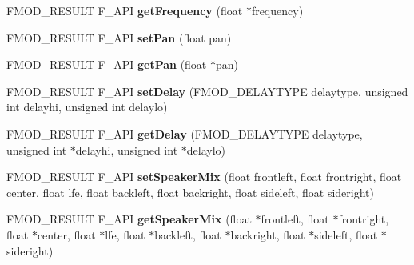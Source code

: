 \begin{DoxyCompactItemize}
\item 
F\+M\+O\+D\+\_\+\+R\+E\+S\+U\+LT F\+\_\+\+A\+PI {\bfseries get\+Frequency} (float $\ast$frequency)\hypertarget{class_f_m_o_d_1_1_channel_a99f1dcf4b2a67f509d08f138e9e3cbca}{}\label{class_f_m_o_d_1_1_channel_a99f1dcf4b2a67f509d08f138e9e3cbca}

\item 
F\+M\+O\+D\+\_\+\+R\+E\+S\+U\+LT F\+\_\+\+A\+PI {\bfseries set\+Pan} (float pan)\hypertarget{class_f_m_o_d_1_1_channel_a419235a572a267b0763287fe988435f7}{}\label{class_f_m_o_d_1_1_channel_a419235a572a267b0763287fe988435f7}

\item 
F\+M\+O\+D\+\_\+\+R\+E\+S\+U\+LT F\+\_\+\+A\+PI {\bfseries get\+Pan} (float $\ast$pan)\hypertarget{class_f_m_o_d_1_1_channel_a776a9e6fbca132087663e77de052806c}{}\label{class_f_m_o_d_1_1_channel_a776a9e6fbca132087663e77de052806c}

\item 
F\+M\+O\+D\+\_\+\+R\+E\+S\+U\+LT F\+\_\+\+A\+PI {\bfseries set\+Delay} (F\+M\+O\+D\+\_\+\+D\+E\+L\+A\+Y\+T\+Y\+PE delaytype, unsigned int delayhi, unsigned int delaylo)\hypertarget{class_f_m_o_d_1_1_channel_a21a2f9d9fdae503ce53a9ced9c4cb9a2}{}\label{class_f_m_o_d_1_1_channel_a21a2f9d9fdae503ce53a9ced9c4cb9a2}

\item 
F\+M\+O\+D\+\_\+\+R\+E\+S\+U\+LT F\+\_\+\+A\+PI {\bfseries get\+Delay} (F\+M\+O\+D\+\_\+\+D\+E\+L\+A\+Y\+T\+Y\+PE delaytype, unsigned int $\ast$delayhi, unsigned int $\ast$delaylo)\hypertarget{class_f_m_o_d_1_1_channel_a8cc8b51bc344dd7916628568764aa6cf}{}\label{class_f_m_o_d_1_1_channel_a8cc8b51bc344dd7916628568764aa6cf}

\item 
F\+M\+O\+D\+\_\+\+R\+E\+S\+U\+LT F\+\_\+\+A\+PI {\bfseries set\+Speaker\+Mix} (float frontleft, float frontright, float center, float lfe, float backleft, float backright, float sideleft, float sideright)\hypertarget{class_f_m_o_d_1_1_channel_ad6b62bf51be6c5c3006e23717e8ad4c7}{}\label{class_f_m_o_d_1_1_channel_ad6b62bf51be6c5c3006e23717e8ad4c7}

\item 
F\+M\+O\+D\+\_\+\+R\+E\+S\+U\+LT F\+\_\+\+A\+PI {\bfseries get\+Speaker\+Mix} (float $\ast$frontleft, float $\ast$frontright, float $\ast$center, float $\ast$lfe, float $\ast$backleft, float $\ast$backright, float $\ast$sideleft, float $\ast$sideright)\hypertarget{class_f_m_o_d_1_1_channel_a1cec99c48524d8cbf6d4454b1ec7a374}{}\label{class_f_m_o_d_1_1_channel_a1cec99c48524d8cbf6d4454b1ec7a374}


\end{DoxyCompactItemize}
